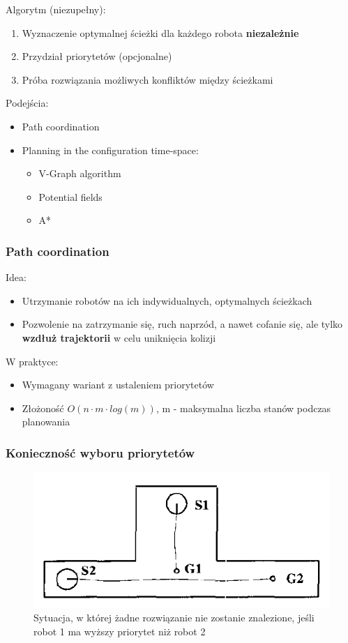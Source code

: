 Algorytm (niezupełny):
\begin{enumerate}
	\item Wyznaczenie optymalnej ścieżki dla każdego robota {\bf niezależnie}
	\item Przydział priorytetów (opcjonalne)
	\item Próba rozwiązania możliwych konfliktów między ścieżkami
\end{enumerate}
Podejścia:
\begin{itemize}
	\item Path coordination
	\item Planning in the configuration time-space: %
		\begin{itemize}
			\item V-Graph algorithm
			\item Potential fields
			\item A*
		\end{itemize}
\end{itemize}

\subsubsection{Path coordination}
Idea:
\begin{itemize}
	\item Utrzymanie robotów na ich indywidualnych, optymalnych ścieżkach
	\item Pozwolenie na zatrzymanie się, ruch naprzód, a nawet cofanie się, ale tylko {\bf wzdłuż trajektorii} w celu uniknięcia kolizji
\end{itemize}
W praktyce:
\begin{itemize}
	\item Wymagany wariant z ustaleniem priorytetów
	\item Złożoność $O(n \cdot m \cdot log(m))$, m - maksymalna liczba stanów podczas planowania %
\end{itemize}

\subsubsection{Konieczność wyboru priorytetów}
\begin{figure}[htp]
	\centering
	\includegraphics[width=\textwidth,keepaspectratio]{img/article1/fig1}
	\caption{Sytuacja, w której żadne rozwiązanie nie zostanie znalezione, jeśli robot 1 ma wyższy priorytet niż robot 2}
\end{figure}

